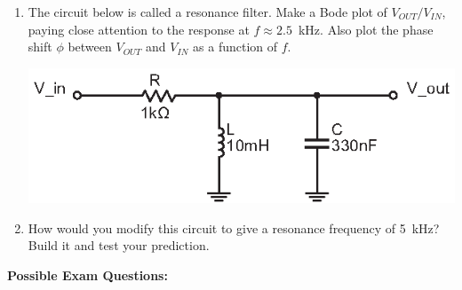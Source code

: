 \begin{enumerate}[wide]
\item The circuit below is called a resonance filter.  Make a Bode plot of $V_{OUT}/V_{IN}$, paying close attention to the response at $f \approx 2.5$~kHz.  Also plot the phase shift $\phi$ between $V_{OUT}$ and $V_{IN}$ as a function of $f$. 
\label{part_resonance_filter}
\begin{center}
\includegraphics{filters/LC_resonance_filter.eps}
\end{center}

\item How would you modify this circuit to give a resonance frequency of 5~kHz?   Build it and test your prediction.


\end{enumerate}

\pagebreak[3]
\textbf{Possible Exam Questions:}


